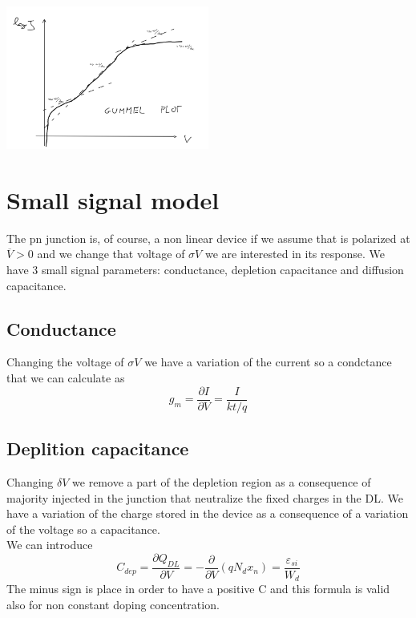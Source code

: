 \centering
\includegraphics[width=0.5\textwidth]{gummel.png}\\
\raggedright

\section{Small signal model}
The pn junction is, of course, a non linear device if we assume that is polarized at $\overline{V}>0$ and we change that voltage of $\sigma V$ we are interested in its response. We have 3 small signal parameters: conductance, depletion capacitance and diffusion capacitance.
\subsection{Conductance}
Changing the voltage of $\sigma V$ we have a variation of the current so a condctance that we can calculate as 
\begin{equation}
g_m=\frac{\partial I}{\partial V}=\frac{I}{kt/q}
\end{equation}
\subsection{Deplition capacitance}
Changing $\delta V$ we remove a part of the depletion region as a consequence of majority injected in the junction that neutralize the fixed charges in the DL. We have a variation of the charge stored in the device as a consequence of a variation of the voltage so a capacitance.\\
We can introduce 
\begin{equation}
C_{dep}=\frac{\partial Q_{DL}}{\partial V}=-\frac{\partial }{\partial V}(qN_dx_n)=\frac{\varepsilon_{si}}{W_d}
\end{equation}
The minus sign is place in order to have a positive C and this formula is valid also for non constant doping concentration.\\
